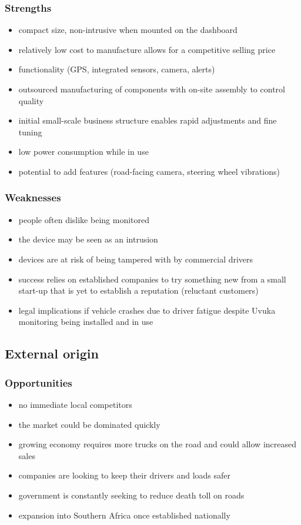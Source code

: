 \subsubsection{Strengths}
\vskip8pt
\begin{itemize}
\item compact size, non-intrusive when mounted on the dashboard
\item relatively low cost to manufacture allows for a competitive selling price
\item functionality (GPS, integrated sensors, camera, alerts)
\item outsourced manufacturing of components with on-site assembly to control quality
\item initial small-scale business structure enables rapid adjustments and fine tuning
\item low power consumption while in use
\item potential to add features (road-facing camera, steering wheel vibrations)
\end{itemize}
\vskip15pt
\subsubsection{Weaknesses}
\vskip8pt
\begin{itemize}
\item people often dislike being monitored
\item the device may be seen as an intrusion
\item devices are at risk of being tampered with by commercial drivers
\item success relies on established companies to try something new from a small start-up that is yet to establish a reputation (reluctant customers)
\item legal implications if vehicle crashes due to driver fatigue despite Uvuka monitoring being installed and in use
\end{itemize}
\vskip15pt
\subsection{External origin}
\subsubsection{Opportunities}
\vskip8pt
\begin{itemize}
\item no immediate local competitors
\item the market could be dominated quickly
\item growing economy requires more trucks on the road and could allow increased sales
\item companies are looking to keep their drivers and loads safer
\item government is constantly seeking to reduce death toll on roads
\item expansion into Southern Africa once established nationally
\end{itemize}

